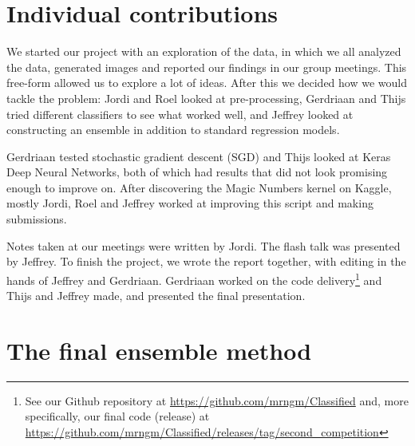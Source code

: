 \documentclass[a4paper,11pt,twocolumn]{article}
\begin{document}
\newpage

\onecolumn
\section{Individual contributions}
We started our project with an exploration of the data, in which we all
analyzed the data, generated images and reported our findings in our group
meetings. This free-form allowed us to explore a lot of ideas. After this we
decided how we would tackle the problem: Jordi and Roel looked at
pre-processing, Gerdriaan and Thijs tried different classifiers to see what
worked well, and Jeffrey looked at constructing an ensemble in addition to
standard regression models.

Gerdriaan tested stochastic gradient descent (SGD) and Thijs looked at Keras
Deep Neural Networks, both of which had results that did not look promising
enough to improve on. After discovering the Magic Numbers kernel on Kaggle,
mostly Jordi, Roel and Jeffrey worked at improving this script and making
submissions.

Notes taken at our meetings were written by Jordi. The flash talk was presented
by Jeffrey. To finish the project, we wrote the report together, with editing in
the hands of Jeffrey and Gerdriaan. Gerdriaan worked on the code
delivery\footnote{See our Github repository at
\url{https://github.com/mrngm/Classified} and, more specifically, our final code
(release) at
\url{https://github.com/mrngm/Classified/releases/tag/second\_competition}} and
Thijs and Jeffrey made, and presented the final presentation.

\clearpage

\appendix
\section{The final ensemble method}
\label{app:final}
\end{document}
